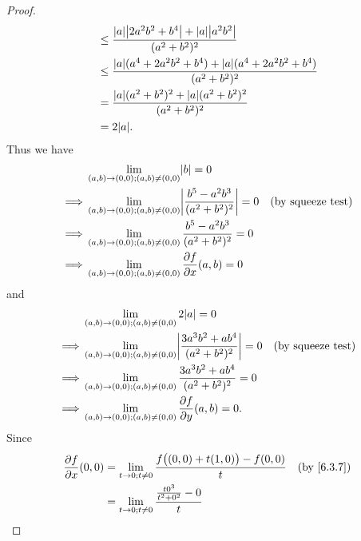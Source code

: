 \begin{proof}
\begin{align*}
                                                  & \leq \frac{\abs{a} \abs{2 a^2 b^2 + b^4} + \abs{a} \abs{a^2 b^2}}{(a^2 + b^2)^2}             \\
                                                  & \leq \frac{\abs{a} (a^4 + 2 a^2 b^2 + b^4) + \abs{a} (a^4 + 2 a^2 b^2 + b^4)}{(a^2 + b^2)^2} \\
                                                  & = \frac{\abs{a} (a^2 + b^2)^2 + \abs{a} (a^2 + b^2)^2}{(a^2 + b^2)^2}                        \\
                                                  & = 2 \abs{a}.
  \end{align*}
  Thus we have
  \begin{align*}
             & \lim_{(a, b) \to (0, 0) ; (a, b) \neq (0, 0)} \abs{b} = 0                                                              \\
    \implies & \lim_{(a, b) \to (0, 0) ; (a, b) \neq (0, 0)} \abs{\frac{b^5 - a^2 b^3}{(a^2 + b^2)^2}} = 0 & \text{(by squeeze test)} \\
    \implies & \lim_{(a, b) \to (0, 0) ; (a, b) \neq (0, 0)} \frac{b^5 - a^2 b^3}{(a^2 + b^2)^2} = 0                                  \\
    \implies & \lim_{(a, b) \to (0, 0) ; (a, b) \neq (0, 0)} \frac{\partial f}{\partial x}(a, b) = 0
  \end{align*}
  and
  \begin{align*}
             & \lim_{(a, b) \to (0, 0) ; (a, b) \neq (0, 0)} 2 \abs{a} = 0                                                                \\
    \implies & \lim_{(a, b) \to (0, 0) ; (a, b) \neq (0, 0)} \abs{\frac{3 a^3 b^2 + a b^4}{(a^2 + b^2)^2}} = 0 & \text{(by squeeze test)} \\
    \implies & \lim_{(a, b) \to (0, 0) ; (a, b) \neq (0, 0)} \frac{3 a^3 b^2 + a b^4}{(a^2 + b^2)^2} = 0                                  \\
    \implies & \lim_{(a, b) \to (0, 0) ; (a, b) \neq (0, 0)} \frac{\partial f}{\partial y}(a, b) = 0.
  \end{align*}
  Since
  \begin{align*}
    \frac{\partial f}{\partial x}(0, 0) & = \lim_{t \to 0 ; t \neq 0} \frac{f\big((0, 0) + t(1, 0)\big) - f(0, 0)}{t} & \text{(by \cref{6.3.7})} \\
                                        & = \lim_{t \to 0 ; t \neq 0} \frac{\frac{t 0^3}{t^2 + 0^2} - 0}{t}                                      \\

\end{align*}
\end{proof}
